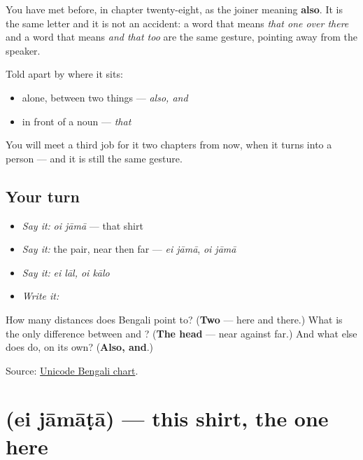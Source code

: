 \begin{grammarlens}[title={Grammar Lens: one letter, two jobs}]
You have met \textbf{} before, in chapter twenty-eight, as the joiner meaning \textbf{also}. It is the same letter and it is not an accident: a word that means \emph{that one over there} and a word that means \emph{and that too} are the same gesture, pointing away from the speaker.

Told apart by where it sits:

\begin{itemize}
\raggedright
  \item \textbf{} alone, between two things — \emph{also, and}
  \item \textbf{} in front of a noun — \emph{that}
\end{itemize}

You will meet a third job for it two chapters from now, when it turns into a person — and it is still the same gesture.
\end{grammarlens}

\subsection*{Your turn}
\begin{itemize}
\raggedright
  \item \emph{Say it:} \emph{oi jāmā} — that shirt
  \item \emph{Say it:} the pair, near then far — \emph{ei jāmā}, \emph{oi jāmā}
  \item \emph{Say it:} \emph{ei lāl, oi kālo}
  \item \emph{Write it:}  
\end{itemize}

\begin{tcolorbox}[breakable,colback=teal!4,colframe=teal!35!black,title={Before you move on}]
How many distances does Bengali point to? (\textbf{Two} — here and there.) What is the only difference between \textbf{} and \textbf{}? (\textbf{The head} — near against far.) And what else does \textbf{} do, on its own? (\textbf{Also, and}.)

Source: \href{https://www.unicode.org/charts/PDF/U0980.pdf}{Unicode Bengali chart}.
\end{tcolorbox}
\section[\texorpdfstring{\bn{এই} \bn{জামাটা} (ei jāmāṭā)}{এই জামাটা (ei jāmāṭā)}]{  (ei jāmāṭā) — this shirt, the one here}

